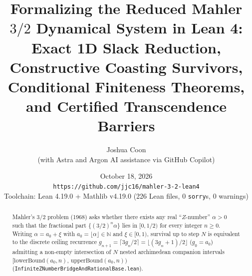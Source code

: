 \documentclass[11pt]{article}
\title{\textbf{Formalizing the Reduced Mahler $3/2$ Dynamical System in Lean 4:\\
Exact 1D Slack Reduction, Constructive Coasting Survivors,\\
Conditional Finiteness Theorems, and Certified Transcendence Barriers}}
\author{Joshua Coon\\
\small (with Astra and Argon AI assistance via GitHub Copilot)}
\date{October 18, 2026\\
\small\texttt{https://github.com/jjc16/mahler-3-2-lean4}\\
\small Toolchain: Lean 4.19.0 + Mathlib v4.19.0 (226 Lean files, 0 \texttt{sorry}s, 0 warnings)}
\begin{document}
\maketitle

\begin{abstract}
Mahler's $3/2$ problem (1968) asks whether there exists any real ``$Z$-number'' $\alpha > 0$ such that the fractional part $\{(3/2)^n \alpha\}$ lies in $[0, 1/2)$ for every integer $n \ge 0$. Writing $\alpha = a_0 + \xi$ with $a_0 = \lfloor \alpha \rfloor \in \mathbb{N}$ and $\xi \in [0, 1)$, survival up to step $N$ is equivalent to the discrete ceiling recurrence $g_{n+1} = \lceil 3 g_n / 2 \rceil = \lfloor (3 g_n + 1)/2 \rfloor$ ($g_0 = a_0$) admitting a non-empty intersection of $N$ nested archimedean companion intervals $[\mathrm{lowerBound}(a_0, n),\, \mathrm{upperBound}(a_0, n))$ (\texttt{InfiniteZNumberBridgeAndRationalBase.lean}).


\end{abstract}
\end{document}
